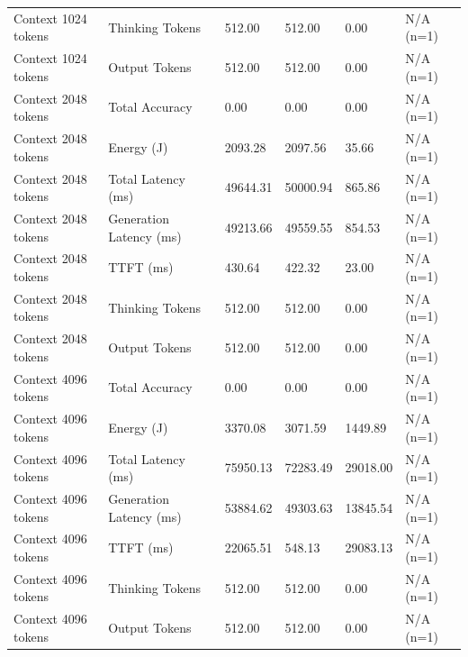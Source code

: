 \begin{table}
\begin{tabular}{llllll}
Context 1024 tokens & Thinking Tokens & 512.00 & 512.00 & 0.00 & N/A (n=1) \\
Context 1024 tokens & Output Tokens & 512.00 & 512.00 & 0.00 & N/A (n=1) \\
Context 2048 tokens & Total Accuracy & 0.00 & 0.00 & 0.00 & N/A (n=1) \\
Context 2048 tokens & Energy (J) & 2093.28 & 2097.56 & 35.66 & N/A (n=1) \\
Context 2048 tokens & Total Latency (ms) & 49644.31 & 50000.94 & 865.86 & N/A (n=1) \\
Context 2048 tokens & Generation Latency (ms) & 49213.66 & 49559.55 & 854.53 & N/A (n=1) \\
Context 2048 tokens & TTFT (ms) & 430.64 & 422.32 & 23.00 & N/A (n=1) \\
Context 2048 tokens & Thinking Tokens & 512.00 & 512.00 & 0.00 & N/A (n=1) \\
Context 2048 tokens & Output Tokens & 512.00 & 512.00 & 0.00 & N/A (n=1) \\
Context 4096 tokens & Total Accuracy & 0.00 & 0.00 & 0.00 & N/A (n=1) \\
Context 4096 tokens & Energy (J) & 3370.08 & 3071.59 & 1449.89 & N/A (n=1) \\
Context 4096 tokens & Total Latency (ms) & 75950.13 & 72283.49 & 29018.00 & N/A (n=1) \\
Context 4096 tokens & Generation Latency (ms) & 53884.62 & 49303.63 & 13845.54 & N/A (n=1) \\
Context 4096 tokens & TTFT (ms) & 22065.51 & 548.13 & 29083.13 & N/A (n=1) \\
Context 4096 tokens & Thinking Tokens & 512.00 & 512.00 & 0.00 & N/A (n=1) \\
Context 4096 tokens & Output Tokens & 512.00 & 512.00 & 0.00 & N/A (n=1) \\
\bottomrule
\end{tabular}
\end{table}
